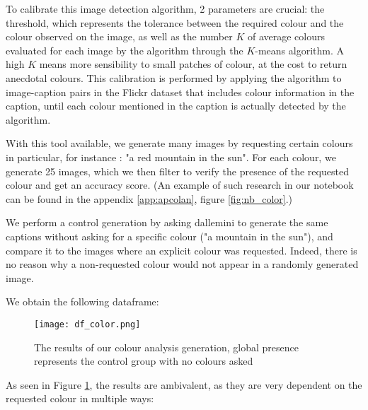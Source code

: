 \documentclass{article}
\begin{document}
\begin{multicols}{2}
To calibrate this image detection algorithm, 2 parameters are crucial: the threshold, which represents the tolerance between the required colour and the colour observed on the image, as well as the number $K$ of average colours evaluated for each image by the algorithm through the $K$-means algorithm. A high $K$ means more sensibility to small patches of colour, at the cost to return anecdotal colours. This calibration is performed by applying the algorithm to image-caption pairs in the Flickr dataset that includes colour information in the caption, until each colour mentioned in the caption is actually detected by the algorithm.

With this tool available, we generate many images by requesting certain colours in particular, for instance : "a red mountain in the sun". For each colour, we generate 25 images, which we then filter to verify the presence of the requested colour and get an accuracy score. (An example of such research in our notebook can be found in the appendix \ref{app:apcolan}, figure \ref{fig:nb_color}.)

We perform a control generation by asking \gls{dallemini} to generate the same captions without asking for a specific colour ("a mountain in the sun"), and compare it to the images where an explicit colour was requested. Indeed, there is no reason why a non-requested colour would not appear in a randomly generated image.

We obtain the following dataframe:

\begin{figure}[H]
    \centering
    \texttt{[image: df\_color.png]}
    \caption{The results of our colour analysis generation, global presence represents the control group with no colours asked}
    \label{fig:df_color}
\end{figure}

As seen in Figure \ref{fig:df_color}, the results are ambivalent, as they are very dependent on the requested colour in multiple ways: 


\end{multicols}
\end{document}
